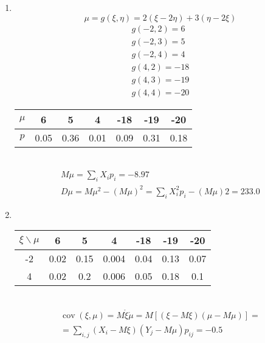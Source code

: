 \documentclass[12pt]{article}
\DeclareMathOperator{\cov}{cov}
\begin{document}
\begin{enumerate}
	\item \mbox{}\\
	      \[\mu = g(\xi, \eta) = 2(\xi - 2\eta) + 3(\eta - 2\xi)\]
	      \begin{gather*}
		      g(-2, 2) = 6 \\
		      g(-2, 3) = 5 \\
		      g(-2, 4) = 4 \\
		      g(4, 2) = -18 \\
		      g(4, 3) = -19 \\
		      g(4, 4) = -20
	      \end{gather*}
	      \begin{tabular}{|c|c|c|c|c|c|c|}
		      \hline
		      $\mu$ & 6    & 5    & 4    & -18  & -19  & -20  \\
		      \hline
		      $p$   & 0.05 & 0.36 & 0.01 & 0.09 & 0.31 & 0.18 \\
		      \hline
	      \end{tabular} \\

	      \begin{gather*}
		      M\mu = \sum_iX_ip_i = -8.97 \\
		      D\mu = M\mu^2 - (M\mu)^2 = \sum_iX_i^2p_i - (M\mu)2 = 233.0
	      \end{gather*}

	\item \mbox{}\\

	      \begin{tabular}{|c|c|c|c|c|c|c|}
		      \hline
		      $\xi \backslash \mu$ & 6    & 5    & 4     & -18  & -19  & -20  \\
		      \hline
		      -2                   & 0.02 & 0.15 & 0.004 & 0.04 & 0.13 & 0.07 \\
		      \hline
		      4                    & 0.02 & 0.2  & 0.006 & 0.05 & 0.18 & 0.1  \\
		      \hline
	      \end{tabular} \\

	      \begin{gather*}
		      \cov(\xi, \mu) = M\mathring{\xi}\mathring{\mu} = M[(\xi - M\xi)(\mu - M\mu)] = \\
		      = \sum_{i,j}(X_i-M\xi)(Y_j - M\mu)p_{ij} = -0.5
	      \end{gather*}

\end{enumerate}
\end{document}
